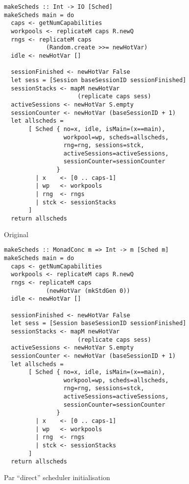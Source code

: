 \begin{landscape}
\begin{figure*}[t]
  \captionsetup{format=fnoline}
  \centering
  \begin{minipage}[t]{0.49\linewidth}
    \begin{verbatim}
makeScheds :: Int -> IO [Sched]
makeScheds main = do
  caps <- getNumCapabilities
  workpools <- replicateM caps R.newQ
  rngs <- replicateM caps
            (Random.create >>= newHotVar)
  idle <- newHotVar []

  sessionFinished <- newHotVar False
  let sess = [Session baseSessionID sessionFinished]
  sessionStacks <- mapM newHotVar
                     (replicate caps sess)
  activeSessions <- newHotVar S.empty
  sessionCounter <- newHotVar (baseSessionID + 1)
  let allscheds =
       [ Sched { no=x, idle, isMain=(x==main),
                 workpool=wp, scheds=allscheds,
                 rng=rng, sessions=stck,
                 activeSessions=activeSessions,
                 sessionCounter=sessionCounter
               }
         | x    <- [0 .. caps-1]
         | wp   <- workpools
         | rng  <- rngs
         | stck <- sessionStacks
       ]
  return allscheds
    \end{verbatim}
    \caption*{Original}
  \end{minipage}
  \begin{minipage}[t]{0.49\linewidth}
    \begin{verbatim}
makeScheds :: MonadConc m => Int -> m [Sched m]
makeScheds main = do
  caps <- getNumCapabilities
  workpools <- replicateM caps R.newQ
  rngs <- replicateM caps
            (newHotVar (mkStdGen 0))
  idle <- newHotVar []

  sessionFinished <- newHotVar False
  let sess = [Session baseSessionID sessionFinished]
  sessionStacks <- mapM newHotVar
                     (replicate caps sess)
  activeSessions <- newHotVar S.empty
  sessionCounter <- newHotVar (baseSessionID + 1)
  let allscheds =
       [ Sched { no=x, idle, isMain=(x==main),
                 workpool=wp, scheds=allscheds,
                 rng=rng, sessions=stck,
                 activeSessions=activeSessions,
                 sessionCounter=sessionCounter
               }
         | x    <- [0 .. caps-1]
         | wp   <- workpools
         | rng  <- rngs
         | stck <- sessionStacks
       ]
  return allscheds
    \end{verbatim}
    \caption*{\dejafu{}}
  \end{minipage}
  \caption{Par ``direct'' scheduler initialisation}
  \label{fig:example-parmonad-sched}
\end{figure*}
\end{landscape}